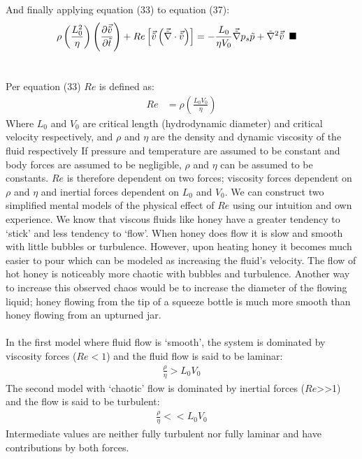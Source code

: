 \documentclass[titlepage]{article}
\begin{document}
    \noindent And finally applying equation (33) to equation (37): 
    \begin{align}
        \rho\left(\displaystyle\frac{L_{0}^2}{\eta}\right)\left(\displaystyle\frac{\partial{\vec{\tilde{v}}}}{\partial{\tilde{t}}}\right) + Re\left[\vec{\tilde{v}}\left(\vec{\tilde{\nabla}}\cdot\vec{\tilde{v}}\right)\right] &= -\displaystyle\frac{L_{0}}{\eta{V_{0}}}\vec{\tilde{\nabla}}p_{s}\tilde{p} + \tilde{\nabla}^2\vec{\tilde{v}} \hspace*{5pt}\blacksquare
    \end{align}

\newpage
\section{}
    \noindent Per equation (33) $Re$ is defined as: 
    \begin{align*}
        Re &= \rho\left(\displaystyle\frac{L_{0}V_{0}}{\eta}\right)
    \end{align*}
    \noindent  Where $L_{0}$ and $V_{0}$ are critical length (hydrodynamic diameter) and critical velocity respectively, and $\rho$ and $\eta$ are the density and dynamic viscosity of the fluid respectively If pressure and temperature are assumed to be constant and body forces are assumed to be negligible, $\rho$ and $\eta$ can be assumed to be constants. $Re$ is therefore dependent on two forces; viscosity forces dependent on $\rho$ and $\eta$ and inertial forces dependent on $L_{0}$ and $V_{0}$. We can construct two simplified mental models of the physical effect of $Re$ using our intuition and own experience. We know that viscous fluids like honey have a greater tendency to `stick' and less tendency to `flow'. When honey does flow it is slow and smooth with little bubbles or turbulence. However, upon heating honey it becomes much easier to pour which can be modeled as increasing the fluid's velocity. The flow of hot honey is noticeably more chaotic with bubbles and turbulence. Another way to increase this observed chaos would be to increase the diameter of the flowing liquid; honey flowing from the tip of a squeeze bottle is much more smooth than honey flowing from an upturned jar. \\ \\ 
    \noindent In the first model where fluid flow is `smooth', the system is dominated by viscosity forces ($Re < 1$) and the fluid flow is said to be laminar:
    \begin{align}
        \displaystyle\frac{\rho}{\eta} > L_{0}V_{0}
    \end{align}
    \noindent The second model with `chaotic' flow is dominated by inertial forces ($Re$>{}>1) and the flow is said to be turbulent: 
    \begin{align}
        \displaystyle\frac{\rho}{\eta} << L_{0}V_{0}
    \end{align}
    \noindent Intermediate values are neither fully turbulent nor fully laminar and have contributions by both forces. 
\end{document}
